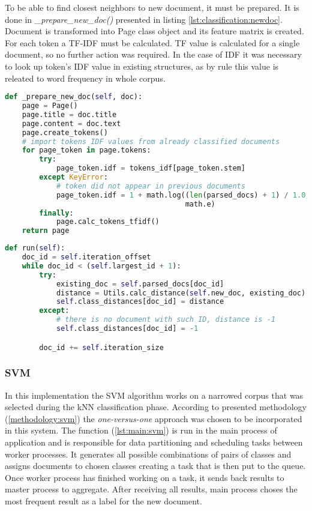 To be able to find closest neighbors to new document, it must be prepared. It is done in \textit{\_prepare\_new\_doc()} presented in listing \ref{lst:classification:newdoc}. Document is transformed into Page class object and its feature matrix is created. For each token a TF-IDF must be calculated. TF value is calculated for a single document, so no further action was required. In the case of IDF it was necessary to look up token's IDF value in existing structures, as by rule this value is releated to word frequency in whole corpus.

\begin{lstlisting}[language=Python, caption={prepare\_new\_doc() - Method used in classification for parsing new document}, label={lst:classification:newdoc}]
def _prepare_new_doc(self, doc):
    page = Page()
    page.title = doc.title
    page.content = doc.text
    page.create_tokens()
    # import tokens IDF values from already classified documents
    for page_token in page.tokens:
        try:
            page_token.idf = tokens_idf[page_token.stem]
        except KeyError:
            # token did not appear in previous documents
            page_token.idf = 1 + math.log((len(parsed_docs) + 1) / 1.0,
                                          math.e)
        finally:
            page.calc_tokens_tfidf()
    return page
\end{lstlisting}

\begin{lstlisting}[language=Python, caption={Classification.run() - Classification class process main method}, label={lst:classification:run}]
def run(self):
    doc_id = self.iteration_offset
    while doc_id < (self.largest_id + 1):
        try:
            existing_doc = self.parsed_docs[doc_id]
            distance = Utils.calc_distance(self.new_doc, existing_doc)
            self.class_distances[doc_id] = distance
        except:
            # there is no document with such ID, distance is -1
            self.class_distances[doc_id] = -1

        doc_id += self.iteration_size
\end{lstlisting}

\subsubsection{SVM}
In this implementation the SVM algorithm works on a narrowed corpus that was selected during the kNN classification phase. According to presented methodology (\ref{methodology:svm}) the \textit{one-versus-one} approach was chosen to be incorporated in this system. The function (\ref{lst:main:svm}) is run in the main process of application and is responsible for data partitioning and scheduling tasks between worker processes. It generates all possible combinations of pairs of classes and assigns documents to chosen classes creating a task that is then put to the queue. Once worker process has finished working on a task, it sends back results to master process to aggregate. After receiving all results, main process choses the most frequent result as a label for the new document.

